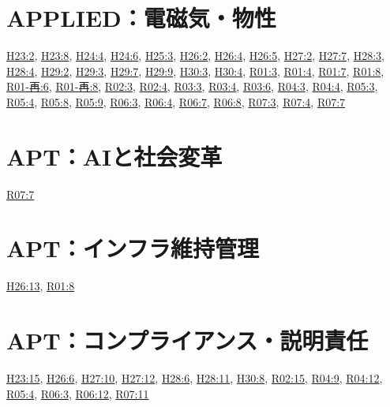 \section{APPLIED：電磁気・物性}
\hyperref[q:h23-reg-applied-02]{H23:2}, \hyperref[q:h23-reg-applied-08]{H23:8}, \hyperref[q:h24-reg-applied-04]{H24:4}, \hyperref[q:h24-reg-applied-06]{H24:6}, \hyperref[q:h25-reg-applied-03]{H25:3}, \hyperref[q:h26-reg-applied-02]{H26:2}, \hyperref[q:h26-reg-applied-04]{H26:4}, \hyperref[q:h26-reg-applied-05]{H26:5}, \hyperref[q:h27-reg-applied-02]{H27:2}, \hyperref[q:h27-reg-applied-07]{H27:7}, \hyperref[q:h28-reg-applied-03]{H28:3}, \hyperref[q:h28-reg-applied-04]{H28:4}, \hyperref[q:h29-reg-applied-02]{H29:2}, \hyperref[q:h29-reg-applied-03]{H29:3}, \hyperref[q:h29-reg-applied-07]{H29:7}, \hyperref[q:h29-reg-applied-09]{H29:9}, \hyperref[q:h30-reg-applied-03]{H30:3}, \hyperref[q:h30-reg-applied-04]{H30:4}, \hyperref[q:r01-reg-applied-03]{R01:3}, \hyperref[q:r01-reg-applied-04]{R01:4}, \hyperref[q:r01-reg-applied-07]{R01:7}, \hyperref[q:r01-reg-applied-08]{R01:8}, \hyperref[q:r01-ret-applied-06]{R01-再:6}, \hyperref[q:r01-ret-applied-08]{R01-再:8}, \hyperref[q:r02-reg-applied-03]{R02:3}, \hyperref[q:r02-reg-applied-04]{R02:4}, \hyperref[q:r03-reg-applied-03]{R03:3}, \hyperref[q:r03-reg-applied-04]{R03:4}, \hyperref[q:r03-reg-applied-06]{R03:6}, \hyperref[q:r04-reg-applied-03]{R04:3}, \hyperref[q:r04-reg-applied-04]{R04:4}, \hyperref[q:r05-reg-applied-03]{R05:3}, \hyperref[q:r05-reg-applied-04]{R05:4}, \hyperref[q:r05-reg-applied-08]{R05:8}, \hyperref[q:r05-reg-applied-09]{R05:9}, \hyperref[q:r06-reg-applied-03]{R06:3}, \hyperref[q:r06-reg-applied-04]{R06:4}, \hyperref[q:r06-reg-applied-07]{R06:7}, \hyperref[q:r06-reg-applied-08]{R06:8}, \hyperref[q:r07-reg-applied-03]{R07:3}, \hyperref[q:r07-reg-applied-04]{R07:4}, \hyperref[q:r07-reg-applied-07]{R07:7}
\section{APT：AIと社会変革}
\hyperref[q:r07-reg-apt-07]{R07:7}
\section{APT：インフラ維持管理}
\hyperref[q:h26-reg-apt-13]{H26:13}, \hyperref[q:r01-reg-apt-08]{R01:8}
\section{APT：コンプライアンス・説明責任}
\hyperref[q:h23-reg-apt-15]{H23:15}, \hyperref[q:h26-reg-apt-06]{H26:6}, \hyperref[q:h27-reg-apt-10]{H27:10}, \hyperref[q:h27-reg-apt-12]{H27:12}, \hyperref[q:h28-reg-apt-06]{H28:6}, \hyperref[q:h28-reg-apt-11]{H28:11}, \hyperref[q:h30-reg-apt-08]{H30:8}, \hyperref[q:r02-reg-apt-15]{R02:15}, \hyperref[q:r04-reg-apt-09]{R04:9}, \hyperref[q:r04-reg-apt-12]{R04:12}, \hyperref[q:r05-reg-apt-04]{R05:4}, \hyperref[q:r06-reg-apt-03]{R06:3}, \hyperref[q:r06-reg-apt-12]{R06:12}, \hyperref[q:r07-reg-apt-11]{R07:11}
